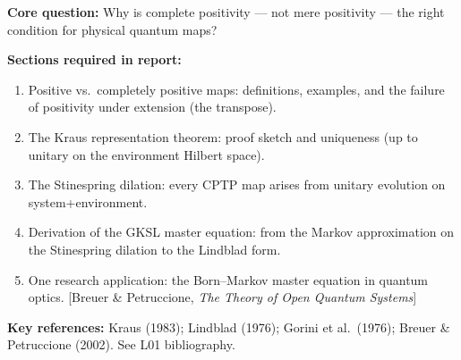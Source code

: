 \documentclass[11pt,a4paper]{article}
\begin{document}
\begin{tcolorbox}[gradprobbox, title={Project CG2 --- Complete Positivity, Quantum Channels, and the GKSL Theorem}]
\textbf{Core question:} Why is complete positivity — not mere positivity — the right
condition for physical quantum maps?

\medskip\textbf{Sections required in report:}
\begin{enumerate}[leftmargin=1.8em, label=\textbf{\arabic*.}, itemsep=6pt]
  \item Positive vs.\ completely positive maps: definitions, examples, and the
        failure of positivity under extension (the transpose).
  \item The Kraus representation theorem: proof sketch and uniqueness (up to
        unitary on the environment Hilbert space).
  \item The Stinespring dilation: every CPTP map arises from unitary evolution on
        system+environment.
  \item Derivation of the GKSL master equation: from the Markov approximation
        on the Stinespring dilation to the Lindblad form.
  \item One research application: the Born--Markov master equation in quantum optics.
        [Breuer \& Petruccione, \textit{The Theory of Open Quantum Systems}]
\end{enumerate}

\medskip\textbf{Key references:} Kraus (1983); Lindblad (1976); Gorini et al.\ (1976);
Breuer \& Petruccione (2002). See L01 bibliography.
\end{tcolorbox}

\bigskip
\end{document}
